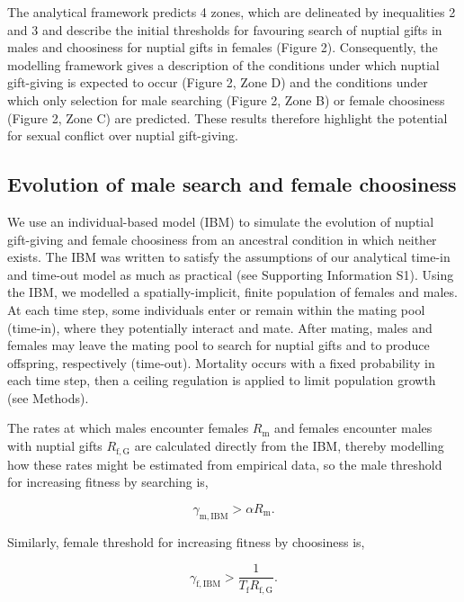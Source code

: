 \documentclass[
]{article}
\begin{document}
The analytical framework predicts 4 zones, which are delineated by
inequalities 2 and 3 and describe the initial thresholds for favouring
search of nuptial gifts in males and choosiness for nuptial gifts in
females (Figure 2). Consequently, the modelling framework gives a
description of the conditions under which nuptial gift-giving is
expected to occur (Figure 2, Zone D) and the conditions under which only
selection for male searching (Figure 2, Zone B) or female choosiness
(Figure 2, Zone C) are predicted. These results therefore highlight the
potential for sexual conflict over nuptial gift-giving.

\hypertarget{evolution-of-male-search-and-female-choosiness}{%
\subsection{Evolution of male search and female
choosiness}\label{evolution-of-male-search-and-female-choosiness}}

We use an individual-based model (IBM) to simulate the evolution of
nuptial gift-giving and female choosiness from an ancestral condition in
which neither exists. The IBM was written to satisfy the assumptions of
our analytical time-in and time-out model as much as practical (see
Supporting Information S1). Using the IBM, we modelled a
spatially-implicit, finite population of females and males. At each time
step, some individuals enter or remain within the mating pool (time-in),
where they potentially interact and mate. After mating, males and
females may leave the mating pool to search for nuptial gifts and to
produce offspring, respectively (time-out). Mortality occurs with a
fixed probability in each time step, then a ceiling regulation is
applied to limit population growth (see Methods).

The rates at which males encounter females \(R_{\mathrm{m}}\) and
females encounter males with nuptial gifts \(R_{\mathrm{f,G}}\) are
calculated directly from the IBM, thereby modelling how these rates
might be estimated from empirical data, so the male threshold for
increasing fitness by searching is,

\begin{equation}
\gamma_{\mathrm{m, IBM}} > \alpha R_{\mathrm{m}}.
\end{equation}

Similarly, female threshold for increasing fitness by choosiness is,

\begin{equation}
\gamma_{\mathrm{f, IBM}} > \frac{1}{T_{\mathrm{f}}R_{\mathrm{f,G}}}.
\end{equation}
\end{document}
